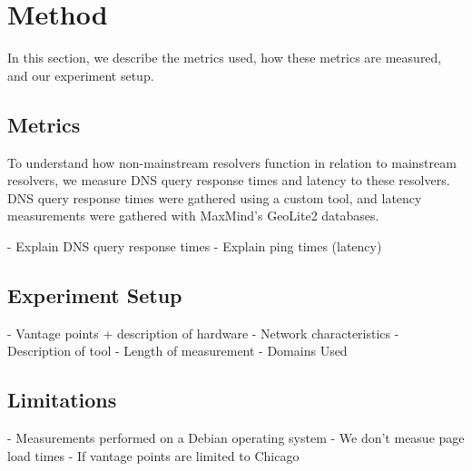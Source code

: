 \section{Method}\label{sec:method}

In this section, we describe the metrics used, how these metrics are measured, and our experiment setup.

\subsection{Metrics}
To understand how non-mainstream resolvers function in relation to mainstream resolvers, we measure DNS query response times and latency to these resolvers. 
DNS query response times were gathered using a custom tool, and latency measurements were gathered with MaxMind's GeoLite2 databases.

- Explain DNS query response times
- Explain ping times (latency)

\subsection{Experiment Setup}
- Vantage points + description of hardware
- Network characteristics
- Description of tool
- Length of measurement
- Domains Used

\subsection{Limitations}
	- Measurements performed on a Debian operating system 
	- We don't measue page load times 
	- If vantage points are limited to Chicago 
	